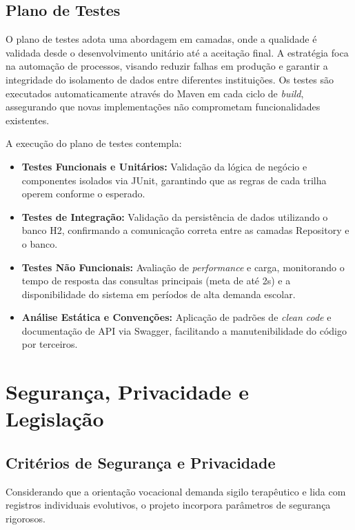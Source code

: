\subsection{Plano de Testes}

O plano de testes adota uma abordagem em camadas, onde a qualidade é validada desde o desenvolvimento unitário até a aceitação final. A estratégia foca na automação de processos, visando reduzir falhas em produção e garantir a integridade do isolamento de dados entre diferentes instituições. Os testes são executados automaticamente através do Maven em cada ciclo de \textit{build}, assegurando que novas implementações não comprometam funcionalidades existentes.

A execução do plano de testes contempla:

\begin{itemize}
    \item \textbf{Testes Funcionais e Unitários:} Validação da lógica de negócio e componentes isolados via JUnit, garantindo que as regras de cada trilha operem conforme o esperado.

    \item \textbf{Testes de Integração:} Validação da persistência de dados utilizando o banco H2, confirmando a comunicação correta entre as camadas Repository e o banco.

    \item \textbf{Testes Não Funcionais:} Avaliação de \textit{performance} e carga, monitorando o tempo de resposta das consultas principais (meta de até 2s) e a disponibilidade do sistema em períodos de alta demanda escolar.

    \item \textbf{Análise Estática e Convenções:} Aplicação de padrões de \textit{clean code} e documentação de API via Swagger, facilitando a manutenibilidade do código por terceiros.
\end{itemize}

\section{Segurança, Privacidade e Legislação}

\subsection{Critérios de Segurança e Privacidade}

Considerando que a orientação vocacional demanda sigilo terapêutico e lida com registros individuais evolutivos, o projeto incorpora parâmetros de segurança rigorosos.


